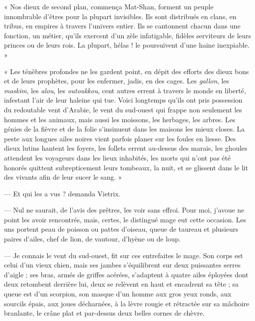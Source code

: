 \documentclass[a4paper, 11pt, oneside, polutonikogreek, french]{article}
\begin{document}
« Nos dieux de second plan, commença Mat-Shan, forment un peuple innombrable d'êtres pour la plupart invisibles. Ils sont distribués en clans, en tribus, en empires à travers l'univers entier. Ils se cantonnent chacun dans une fonction, un métier, qu'ils exercent d'un zèle infatigable, fidèles serviteurs de leurs princes ou de leurs rois. La plupart, hélas ! le poursuivent d'une haine inexpiable. »

« Les ténèbres profondes ne les gardent point, en dépit des efforts des dieux bons et de leurs prophètes, pour les enfermer, jadis, en des cages. Les \emph{gallon}, les \emph{maskim}, les \emph{alou}, les \emph{outoukkou}, cent autres errent à travers le monde en liberté, infestant l'air de leur haleine qui tue. Voici longtemps qu'ils ont pris possession du redoutable vent d'Arabie, le vent du sud-ouest qui frappe non seulement les hommes et les animaux, mais aussi les moissons, les herbages, les arbres. Les génies de la fièvre et de la folie s'insinuent dans les maisons les mieux closes. La peste aux longues ailes noires vient parfois planer sur les foules en liesse. Des dieux lutins hantent les foyers, les follets errent au-dessus des marais, les ghoules attendent les voyageurs dans les lieux inhabités, les morts qui n'ont pas été honorés quittent subrepticement leurs tombeaux, la nuit, et se glissent dans le lit des vivants afin de leur sucer le sang. »

--- Et qui les a vus ? demanda Vietrix.

--- Nul ne saurait, de l'avis des prêtres, les voir sans effroi. Pour moi, j'avoue ne point les avoir rencontrés, mais, certes, le distingué mage eut cette occasion. Les uns portent peau de poisson ou pattes d'oiseau, queue de taureau et plusieurs paires d'ailes, chef de lion, de vautour, d'hyène ou de loup.

\bigskip
\centerline{\EightStarTaper}
\centerline{\EightStarTaper\EightStarTaper}
\bigskip

--- Je connais le vent du sud-ouest, fit sur ces entrefaites le mage. Son corps est celui d'un vieux chien, mais ses jambes s'équilibrent sur deux puissantes serres d'aigle ; ses bras, armés de griffes acérées, s'adaptent à quatre ailes éployées dont deux retombent derrière lui, deux se relèvent en haut et encadrent sa tête ; sa queue est d'un scorpion, son masque d'un homme aux gros yeux ronds, aux sourcils épais, aux joues décharnées, à la lèvre rougie et rétractée sur sa mâchoire branlante, le crâne plat et par-dessus deux belles cornes de chèvre.
\end{document}
